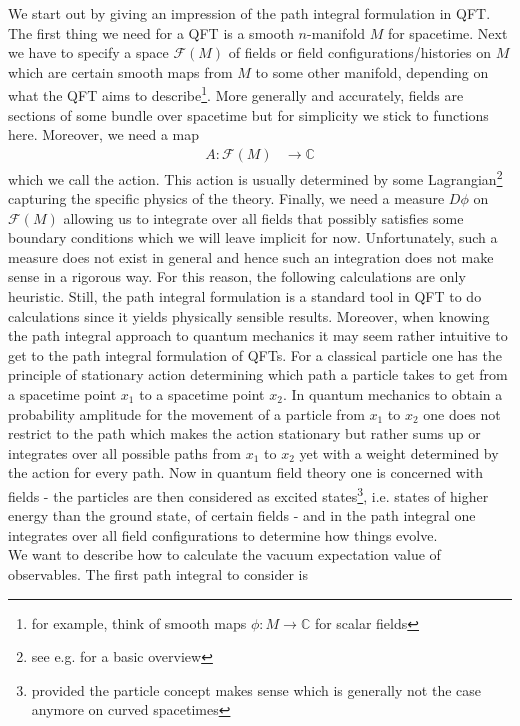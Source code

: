 We start out by giving an impression of the path integral formulation in QFT. The first thing we need for a QFT is a smooth $n$-manifold $M$ for spacetime. Next we have to specify a space $\mathcal{F}(M)$ of fields or field configurations/histories on $M$ which are certain smooth maps from $M$ to some other manifold, depending on what the QFT aims to describe\footnote{for example, think of smooth maps $\phi \colon M \to \mathbb{C}$ for scalar fields}. More generally and accurately, fields are sections of some bundle over spacetime but for simplicity we stick to functions here. Moreover, we need a map
\begin{align*}
  A
  \colon
  \mathcal{F}(M)
  &\to
  \mathbb{C}
\end{align*}
which we call the action. This action is usually determined by some Lagrangian\footnote{see e.g. \cite{64bee405} for a basic overview} capturing the specific physics of the theory. Finally, we need a measure $D\phi$ on $\mathcal{F}(M)$ allowing us to {\glqq}integrate over all fields{\grqq} that possibly satisfies some boundary conditions which we will leave implicit for now. Unfortunately, such a measure does not exist in general and hence such an integration does not make sense in a rigorous way. For this reason, the following calculations are only heuristic. Still, the path integral formulation is a standard tool in QFT to do calculations since it yields physically sensible results. Moreover, when knowing the path integral approach to quantum mechanics it may seem rather intuitive to get to the path integral formulation of QFTs. For a classical particle one has the principle of stationary action determining which path a particle takes to get from a spacetime point $x_{1}$ to a spacetime point $x_{2}$. In quantum mechanics to obtain a probability amplitude for the movement of a particle from $x_{1}$ to $x_{2}$ one does not restrict to the path which makes the action stationary but rather {\glqq}sums up or integrates over all possible paths{\grqq} from $x_{1}$ to $x_{2}$ yet with a weight determined by the action for every path. Now in quantum field theory one is concerned with fields - the particles are then considered as excited states\footnote{provided the particle concept makes sense which is generally not the case anymore on curved spacetimes}, i.e. states of higher energy than the ground state, of certain fields - and in the path integral one {\glqq}integrates over all field configurations{\grqq} to determine how things evolve.
\\
We want to describe how to calculate the vacuum expectation value of observables. The first path integral to consider is
